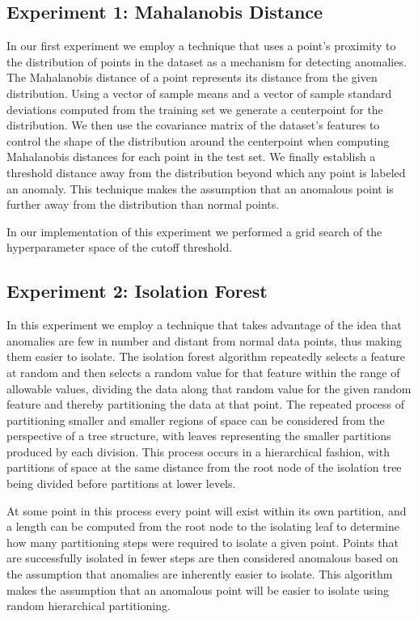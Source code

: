 \documentclass[conference]{IEEEtran}
\begin{document}
\subsection*{Experiment 1: Mahalanobis Distance}

In our first experiment we employ a technique that uses a point's proximity to the distribution of points in the dataset as a mechanism for detecting anomalies. The Mahalanobis distance of a point represents its distance from the given distribution. Using a vector of sample means and a vector of sample standard deviations computed from the training set we generate a centerpoint for the distribution. We then use the covariance matrix of the dataset's features to control the shape of the distribution around the centerpoint when computing Mahalanobis distances for each point in the test set. We finally establish a threshold distance away from the distribution beyond which any point is labeled an anomaly. This technique makes the assumption that an anomalous point is further away from the distribution than normal points.

In our implementation of this experiment we performed a grid search of the hyperparameter space of the cutoff threshold.

\subsection*{Experiment 2: Isolation Forest}

In this experiment we employ a technique that takes advantage of the idea that anomalies are few in number and distant from normal data points, thus making them easier to isolate. The isolation forest algorithm repeatedly selects a feature at random and then selects a random value for that feature within the range of allowable values, dividing the data along that random value for the given random feature and thereby partitioning the data at that point. The repeated process of partitioning smaller and smaller regions of space can be considered from the perspective of a tree structure, with leaves representing the smaller partitions produced by each division. This process occurs in a hierarchical fashion, with partitions of space at the same distance from the root node of the isolation tree being divided before partitions at lower levels.

At some point in this process every point will exist within its own partition, and a length can be computed from the root node to the isolating leaf to determine how many partitioning steps were required to isolate a given point. Points that are successfully isolated in fewer steps are then considered anomalous based on the assumption that anomalies are inherently easier to isolate. This algorithm makes the assumption that an anomalous point will be easier to isolate using random hierarchical partitioning.
\end{document}
